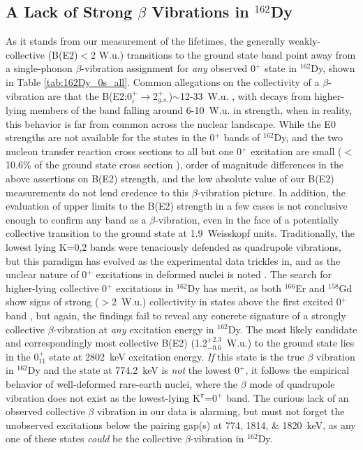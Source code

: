 
\subsection{A Lack of Strong $\beta$ Vibrations in $^{162}$Dy}
As it stands from our measurement of the lifetimes, the generally weakly-collective (B(E2)$<$2 W.u.) transitions to the ground state band point away from a single-phonon $\beta$-vibration assignment for \textit{any} observed 0$^+$ state in $^{162}$Dy, shown in Table \ref{tab:162Dy_0s_all}. Common allegations on the collectivity of a $\beta$-vibration are that the B(E2;0$_i^+\rightarrow$2$^+_{g.s.}$)$\sim$12-33~W.u. \cite{Garrett_betavib2001}, with decays from higher-lying members of the band falling around 6-10~W.u. in strength, when in reality, this behavior is far from common across the nuclear landscape. While the E0 strengths are not available for the states in the 0$^+$ bands of $^{162}$Dy, and the two nucleon transfer reaction cross sections to all but one 0$^+$ excitation are small ($<$10.6\% of the ground state cross section \cite{Meyer_pt0_2006}), order of magnitude differences in the above assertions on B(E2) strength, and the low absolute value of our B(E2) measurements do not lend credence to this $\beta$-vibration picture. In addition, the evaluation of upper limits to the B(E2) strength in a few cases is not conclusive enough to confirm any band as a $\beta$-vibration, even in the face of a potentially collective transition to the ground state at 1.9~Weisskopf units. Traditionally, the lowest lying K=0,2 bands were tenaciously defended as quadrupole vibrations, but this paradigm has evolved as the experimental data trickles in, and as the unclear nature of 0$^+$ excitations in deformed nuclei is noted \cite{SharpeySchafer_beta2011,Garrett_02_beta}. The search for higher-lying collective 0$^+$ excitations in $^{162}$Dy has merit, as both $^{166}$Er and $^{158}$Gd show signs of strong ($>$2~W.u.) collectivity in states above the first excited 0$^+$ band \cite{Lesher_158Gdmain, Garrett_twogammaEr_1997}, but again, the findings fail to reveal any concrete signature of a strongly collective $\beta$-vibration at \textit{any} excitation energy in $^{162}$Dy. The most likely candidate and correspondingly most collective B(E2) (1.2$^{+2.3}_{-0.6}$~W.u.) to the ground state lies in the 0$^+_{11}$ state at 2802~keV excitation energy. \textit{If} this state is the true $\beta$ vibration in $^{162}$Dy and the state at 774.2~keV is \textit{not} the lowest 0$^+$, it follows the empirical behavior of well-deformed rare-earth nuclei, where the $\beta$ mode of quadrupole vibration does not exist as the lowest-lying K$^\pi$=0$^+$ band. The curious lack of an observed collective $\beta$ vibration in our data is alarming, but must not forget the unobserved excitations below the pairing gap(s) at 774, 1814, \& 1820~keV, as any one of these states \textit{could} be the collective $\beta$-vibration in $^{162}$Dy.
